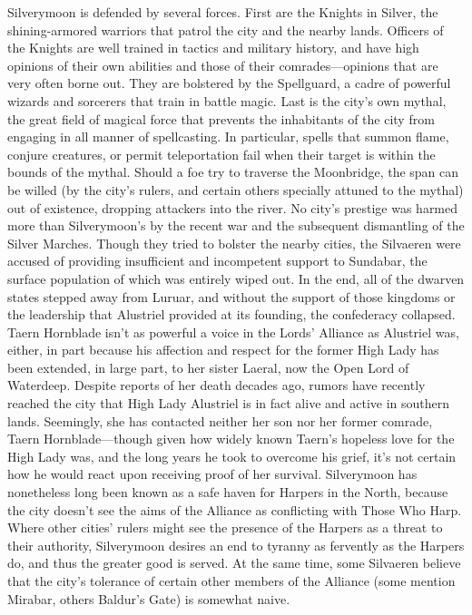 \documentclass[10pt,a4paper,twoside,twocolumn,openany,bg=print,nodeprecatedcode]{dndbook}
\begin{document}
Silverymoon is defended by several forces. First are the Knights in Silver, the shining-armored warriors that patrol the city and the nearby lands. Officers of the Knights are well trained in tactics and military history, and have high opinions of their own abilities and those of their comrades—opinions that are very often borne out. They are bolstered by the Spellguard, a cadre of powerful wizards and sorcerers that train in battle magic. Last is the city's own mythal, the great field of magical force that prevents the inhabitants of the city from engaging in all manner of spellcasting. In particular, spells that summon flame, conjure creatures, or permit teleportation fail when their target is within the bounds of the mythal. Should a foe try to traverse the Moonbridge, the span can be willed (by the city's rulers, and certain others specially attuned to the mythal) out of existence, dropping attackers into the river.
No city's prestige was harmed more than Silverymoon's by the recent war and the subsequent dismantling of the Silver Marches. Though they tried to bolster the nearby cities, the Silvaeren were accused of providing insufficient and incompetent support to Sundabar, the surface population of which was entirely wiped out. In the end, all of the dwarven states stepped away from Luruar, and without the support of those kingdoms or the leadership that Alustriel provided at its founding, the confederacy collapsed. Taern Hornblade isn't as powerful a voice in the Lords' Alliance as Alustriel was, either, in part because his affection and respect for the former High Lady has been extended, in large part, to her sister Laeral, now the Open Lord of Waterdeep.
Despite reports of her death decades ago, rumors have recently reached the city that High Lady Alustriel is in fact alive and active in southern lands. Seemingly, she has contacted neither her son nor her former comrade, Taern Hornblade—though given how widely known Taern's hopeless love for the High Lady was, and the long years he took to overcome his grief, it's not certain how he would react upon receiving proof of her survival.
Silverymoon has nonetheless long been known as a safe haven for Harpers in the North, because the city doesn't see the aims of the Alliance as conflicting with Those Who Harp. Where other cities' rulers might see the presence of the Harpers as a threat to their authority, Silverymoon desires an end to tyranny as fervently as the Harpers do, and thus the greater good is served. At the same time, some Silvaeren believe that the city's tolerance of certain other members of the Alliance (some mention Mirabar, others Baldur's Gate) is somewhat naive.
\end{document}
